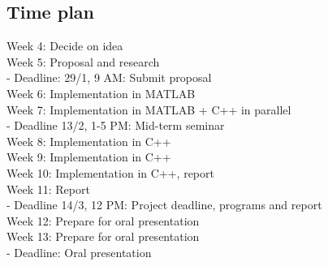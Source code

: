 \documentclass[a4paper,12pt,twoside,swedish]{report}
\begin{document}
\subsection{Time plan}
Week 4: Decide on idea \\
Week 5: Proposal and research \\
- Deadline: 29/1, 9 AM: Submit proposal \\
Week 6: Implementation in MATLAB \\
Week 7: Implementation in MATLAB + C++ in parallel \\
- Deadline 13/2, 1-5 PM: Mid-term seminar \\
Week 8: Implementation in C++ \\
Week 9: Implementation in C++ \\
Week 10: Implementation in C++, report \\
Week 11: Report \\
- Deadline 14/3, 12 PM: Project deadline, programs and report \\
Week 12: Prepare for oral presentation \\
Week 13: Prepare for oral presentation \\
- Deadline: Oral presentation
\end{document}
